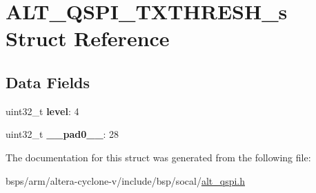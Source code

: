 \hypertarget{structALT__QSPI__TXTHRESH__s}{}\section{A\+L\+T\+\_\+\+Q\+S\+P\+I\+\_\+\+T\+X\+T\+H\+R\+E\+S\+H\+\_\+s Struct Reference}
\label{structALT__QSPI__TXTHRESH__s}
\subsection*{Data Fields}
\begin{DoxyCompactItemize}
\item 
\mbox{\label{structALT__QSPI__TXTHRESH__s_a60fd095aff3a9231fcea075607694aad}} 
uint32\+\_\+t {\bfseries level}\+: 4
\item 
\mbox{\label{structALT__QSPI__TXTHRESH__s_a819a27753f00512fb979ef285976c34b}} 
uint32\+\_\+t {\bfseries \+\_\+\+\_\+pad0\+\_\+\+\_\+}\+: 28
\end{DoxyCompactItemize}


The documentation for this struct was generated from the following file\+:\begin{DoxyCompactItemize}
\item 
bsps/arm/altera-\/cyclone-\/v/include/bsp/socal/\mbox{\hyperlink{include_2bsp_2socal_2alt__qspi_8h}{alt\+\_\+qspi.\+h}}\end{DoxyCompactItemize}
